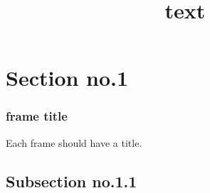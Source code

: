 \documentclass[hyperref={pdfpagelabels=false}]{beamer}
\institute{institute}
\title{text}
\begin{document}
\section{Section no.1} 
\begin{frame}
\frametitle{frame title} 
Each frame should have a title.
\end{frame}
\subsection{Subsection no.1.1  }
\end{document}
